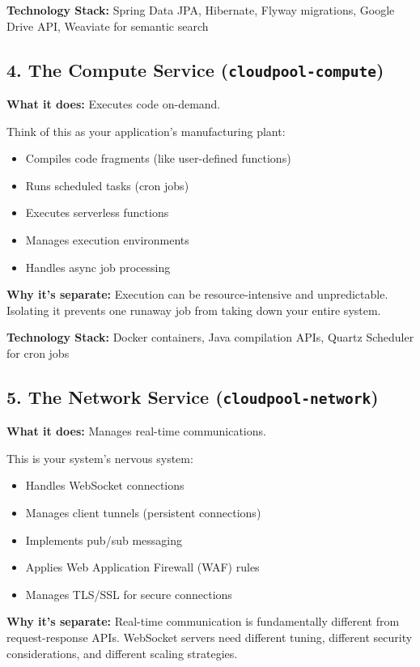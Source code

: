 \documentclass[11pt,a4paper]{report}
\begin{document}
\textbf{Technology Stack:} Spring Data JPA, Hibernate, Flyway migrations, Google Drive API, Weaviate for semantic search


\subsection{4. \textbf{The Compute Service} (\texttt{cloudpool-compute})}

\textbf{What it does:} Executes code on-demand.

Think of this as your application's manufacturing plant:

\begin{itemize}
\item Compiles code fragments (like user-defined functions)
\item Runs scheduled tasks (cron jobs)
\item Executes serverless functions
\item Manages execution environments
\item Handles async job processing

\end{itemize}
\textbf{Why it's separate:} Execution can be resource-intensive and unpredictable. Isolating it prevents one runaway job from taking down your entire system.

\textbf{Technology Stack:} Docker containers, Java compilation APIs, Quartz Scheduler for cron jobs


\subsection{5. \textbf{The Network Service} (\texttt{cloudpool-network})}

\textbf{What it does:} Manages real-time communications.

This is your system's nervous system:

\begin{itemize}
\item Handles WebSocket connections
\item Manages client tunnels (persistent connections)
\item Implements pub/sub messaging
\item Applies Web Application Firewall (WAF) rules
\item Manages TLS/SSL for secure connections

\end{itemize}
\textbf{Why it's separate:} Real-time communication is fundamentally different from request-response APIs. WebSocket servers need different tuning, different security considerations, and different scaling strategies.
\end{document}
